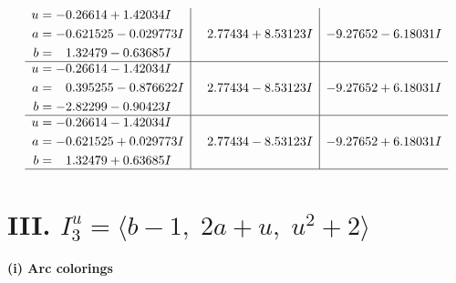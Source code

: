 \documentclass[1p]{elsarticle_modified}
\theoremstyle{definition}
\begin{document}
$$\begin{array}{c|c|c}
\begin{aligned}
u &= -0.26614 + 1.42034 I \\
a &= -0.621525 - 0.029773 I \\
b &= \phantom{-}1.32479 - 0.63685 I\end{aligned}
 & \phantom{-}2.77434 + 8.53123 I & -9.27652 - 6.18031 I \\ \hline\begin{aligned}
u &= -0.26614 - 1.42034 I \\
a &= \phantom{-}0.395255 - 0.876622 I \\
b &= -2.82299 - 0.90423 I\end{aligned}
 & \phantom{-}2.77434 - 8.53123 I & -9.27652 + 6.18031 I \\ \hline\begin{aligned}
u &= -0.26614 - 1.42034 I \\
a &= -0.621525 + 0.029773 I \\
b &= \phantom{-}1.32479 + 0.63685 I\end{aligned}
 & \phantom{-}2.77434 - 8.53123 I & -9.27652 + 6.18031 I\\
 \hline 
 \end{array}$$\newpage\newpage\renewcommand{\arraystretch}{1}
\centering \section*{III. $I^u_{3}= \langle b-1,\;2 a+u,\;u^2+2 \rangle$}
\flushleft \textbf{(i) Arc colorings}\\
\end{document}
